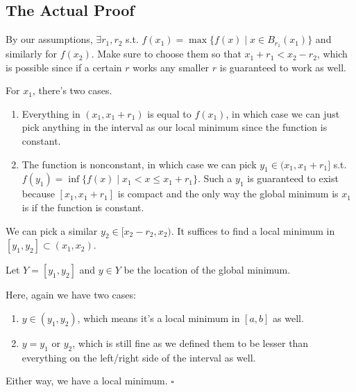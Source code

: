 \documentclass[12pt]{article}
\begin{document}
\subsection{The Actual Proof}

By our assumptions, $\exists r_1, r_2$ s.t.
$f(x_1)=\max \{f(x) \mid x \in B_{r_1}(x_1)\}$ and similarly for $f(x_2)$.
Make sure to choose them so that $x_1+r_1 < x_2-r_2$,
which is possible since if a certain $r$ works any smaller $r$ is guaranteed to work as well.

For $x_1$, there's two cases.
\begin{enumerate}
  \item Everything in $(x_1, x_1+r_1)$ is equal to $f(x_1)$, in which case
        we can just pick anything in the interval as our local minimum since the function is constant.
  \item The function is nonconstant, in which case we can pick $y_1 \in (x_1, x_1+r_1]$
        s.t. $f(y_1)=\inf \{f(x) \mid x_1 < x \le x_1+r_1\}$.
        Such a $y_1$ is guaranteed to exist because $[x_1, x_1+r_1]$ is compact
        and the only way the global minimum is $x_1$ is if the function is constant.
\end{enumerate}

We can pick a similar $y_2 \in [x_2-r_2, x_2)$.
It suffices to find a local minimum in $[y_1, y_2] \subset (x_1, x_2)$.

Let $Y=[y_1, y_2]$ and $y \in Y$ be the location of the global minimum.

Here, again we have two cases:
\begin{enumerate}
  \item $y \in (y_1, y_2)$, which means it's a local minimum in $[a, b]$ as well.
  \item $y=y_1$ or $y_2$, which is still fine as we defined them to be
        lesser than everything on the left/right side of the interval as well.
\end{enumerate}
Either way, we have a local minimum. $\square$
\end{document}
